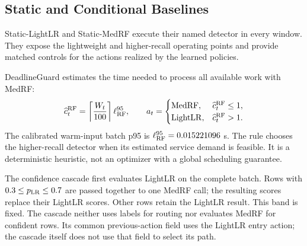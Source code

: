 \documentclass[journal]{IEEEtran}
\begin{document}
\subsection{Static and Conditional Baselines}
Static-LightLR and Static-MedRF execute their named detector in every window. They expose the lightweight and higher-recall operating points and provide matched controls for the actions realized by the learned policies.

DeadlineGuard estimates the time needed to process all available work with MedRF:
\begin{equation}\label{eq:guard}
\widehat c_t^{\rm RF}=\left\lceil\frac{W_t}{100}\right\rceil\ell_{\rm RF}^{95},\qquad
 a_t=\begin{cases}\mathrm{MedRF},&\widehat c_t^{\rm RF}\leq1,\\
 \mathrm{LightLR},&\widehat c_t^{\rm RF}>1.
 \end{cases}
\end{equation}
The calibrated warm-input batch p95 is $\ell_{\rm RF}^{95}=0.015221096$ s. The rule chooses the higher-recall detector when its estimated service demand is feasible. It is a deterministic heuristic, not an optimizer with a global scheduling guarantee.

The confidence cascade first evaluates LightLR on the complete batch. Rows with $0.3\leq p_{\rm LR}\leq0.7$ are passed together to one MedRF call; the resulting scores replace their LightLR scores. Other rows retain the LightLR result. This band is fixed. The cascade neither uses labels for routing nor evaluates MedRF for confident rows. Its common previous-action field uses the LightLR entry action; the cascade itself does not use that field to select its path.
\end{document}
